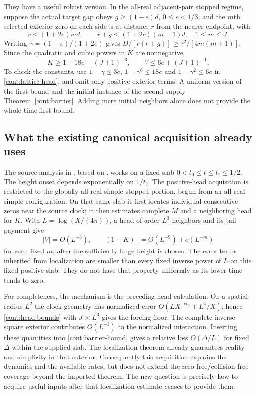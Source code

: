They have a useful robust version. In the all-real adjacent-pair stopped
regime, suppose the actual target gap obeys
$g\ge(1-e)d$, $0\le e<1/3$, and the $m$th selected exterior zero
on each side is at distance $r$ from the nearer endpoint, with
\begin{equation}
 r\le(1+2e)md,\qquad r+g\le(1+2e)(m+1)d,
 \quad 1\le m\le J.
 \label{cont:head-input}
\end{equation}
Writing $\gamma=(1-e)/(1+2e)$ gives
$D/[r(r+g)]\ge\gamma^2/[4m(m+1)]$.
Since the quadratic and cubic powers in $K$ are nonnegative,
\begin{equation}
 K\ge1-18e-(J+1)^{-3},\qquad
 V\le6e+(J+1)^{-1}.
 \label{cont:head-bounds}
\end{equation}
To check the constants, use $1-\gamma\le3e$,
$1-\gamma^6\le18e$ and $1-\gamma^2\le6e$ in
\eqref{cont:lattice-head}, and omit only positive exterior terms.
A uniform version of the first bound and the initial instance of the
second supply Theorem~\ref{cont:barrier}. Adding more initial neighbors
alone does not provide the whole-time first bound.

\subsection{What the existing canonical acquisition already uses}

The source analysis in \cite[\S15]{VCDCMManuscript}, based on
\cite[Theorem 1.5 and \S9]{Polymath2019}, works on a fixed slab
$0<t_0\le t\le t_*\le1/2$. The height onset depends exponentially
on $1/t_0$. The positive-head acquisition is restricted to the globally
all-real simple stopped portion, begun from an all-real simple configuration. On that same slab it first locates individual consecutive
zeros near the source clock; it then estimates complete $M$ and a
neighboring head for $K$. With $L=\log(X/(4\pi))$, a head of
order $L^3$ neighbors and its tail payment give
\[
 |V|=O(L^{-3}),\qquad (1-K)_+=O(L^{-9})+o(L^{-m})
\]
for each fixed $m$, after the sufficiently large height is chosen.
The error terms inherited from localization are smaller than every
fixed inverse power of $L$ on this fixed positive slab. They do not
have that property uniformly as its lower time tends to zero.

For completeness, the mechanism is the preceding head calculation.
On a spatial radius $L^2$ the clock geometry has normalized error
$O(LX^{-c t_0}+L^4/X)$; hence \eqref{cont:head-bounds} with
$J\asymp L^3$ gives the forcing floor. The complete inverse-square
exterior contributes $O(L^{-3})$ to the normalized interaction.
Inserting these quantities into \eqref{cont:barrier-bound} gives a
relative loss $O(\Delta/L)$ for fixed $\Delta$ within the supplied
slab. The localization theorem already guarantees reality and simplicity
in that exterior. Consequently this acquisition explains the dynamics
and the available rates, but does not extend the zero-free/collision-free
coverage beyond the imported theorem. The new question is precisely
how to acquire useful inputs after that localization estimate ceases
to provide them.
